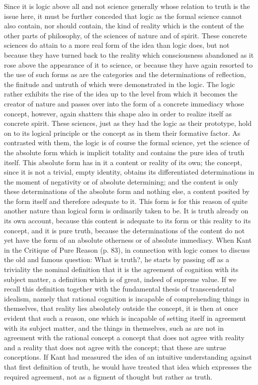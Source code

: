 Since it is logic above all
and not science generally
whose relation to truth is the issue here,
it must be further conceded that
logic as the formal science cannot also contain,
nor should contain, the kind of reality which
is the content of the other parts of philosophy,
of the sciences of nature and of spirit.
These concrete sciences do attain to a more real form 
of the idea than logic does,
but not because they have turned back to the reality
which consciousness abandoned as it rose above 
the appearance of it to science,
or because they have again resorted to
the use of such forms as are the categories
and the determinations of reflection,
the finitude and untruth of which
were demonstrated in the logic.
The logic rather exhibits the rise of the idea
up to the level from which it becomes the creator of nature
and passes over into the form of a concrete immediacy
whose concept, however, again shatters this shape also
in order to realize itself as concrete spirit.
These sciences, just as they had the logic as their prototype,
hold on to its logical principle or the concept
as in them their formative factor.
As contrasted with them, the logic is of course the formal science,
yet the science of the absolute form which is implicit totality
and contains the pure idea of truth itself.
This absolute form has in it a content or reality of its own;
the concept, since it is not a trivial, empty identity,
obtains its differentiated determinations in 
the moment of negativity or of absolute determining;
and the content is only these determinations of 
the absolute form and nothing else,
a content posited by the form itself
and therefore adequate to it.
This form is for this reason of quite another nature than
logical form is ordinarily taken to be.
It is truth already on its own account,
because this content is adequate to its form 
or this reality to its concept,
and it is pure truth, 
because the determinations of the content
do not yet have the form of an absolute otherness 
or of absolute immediacy.
When Kant in the Critique of Pure Reason (p. 83),
in connection with logic comes to discuss
the old and famous question:
What is truth?,
he starts by passing off as a triviality 
the nominal definition that it is the agreement
of cognition with its subject matter,
a definition which is of great, indeed of supreme value.
If we recall this definition together with
the fundamental thesis of transcendental idealism,
namely that rational cognition is incapable
of comprehending things in themselves,
that reality lies absolutely outside the concept,
it is then at once evident that such a reason,
one which is incapable of setting itself 
in agreement with its subject matter,
and the things in themselves,
such as are not in agreement with the rational concept
a concept that does not agree with reality
and a reality that does not agree
with the concept;
that these are untrue conceptions.
If Kant had measured the idea of
an intuitive understanding against
that first definition of truth,
he would have treated that idea
which expresses the required agreement,
not as a figment of thought but rather as truth.

